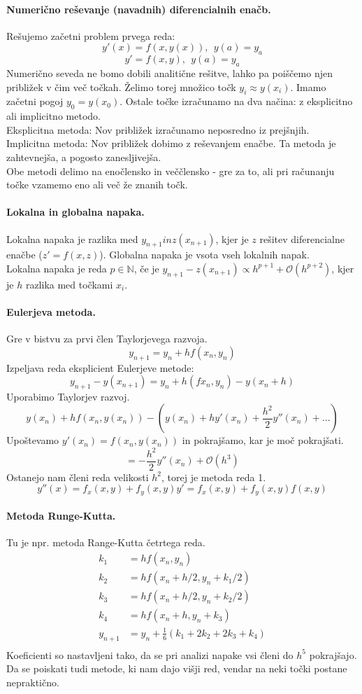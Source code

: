 \documentclass[a4paper]{article}
\newcommand{\N}{\mathbb{N}}
\begin{document}
\paragraph{Numerično reševanje (navadnih) diferencialnih enačb.} Rešujemo začetni problem prvega reda:
$$y'(x) = f(x, y(x)),~~y(a) = y_a$$
$$y' = f(x, y),~~y(a) = y_a$$
Numerično seveda ne bomo dobili analitične rešitve, lahko pa poiščemo njen približek v čim več točkah. 
Želimo torej množico točk $y_i \approx y(x_i)$. Imamo začetni pogoj $y_0 = y(x_0)$. Ostale točke izračunamo na dva načina:
z eksplicitno ali implicitno metodo. \\
Eksplicitna metoda: Nov približek izračunamo neposredno iz prejšnjih. \\
Implicitna metoda: Nov približek dobimo z reševanjem enačbe. Ta metoda je zahtevnejša, a pogosto zanesljivejša. \\
Obe metodi delimo na enočlensko in veččlensko - gre za to, ali pri računanju točke vzamemo eno ali več že znanih točk.
\paragraph{Lokalna in globalna napaka.} Lokalna napaka je razlika med $y_{n+1} in z(x_{n+1})$, kjer je $z$ rešitev diferencialne enačbe ($z' = f(x, z)$).
Globalna napaka je vsota vseh lokalnih napak. \\
Lokalna napaka je reda $p \in \N$, če je
$y_{n+1} - z(x_{n+1}) \propto h^{p+1} + \mathcal{O}(h^{p+2})$, kjer je $h$ razlika med točkami $x_i$.
\paragraph{Eulerjeva metoda.} Gre v bistvu za prvi člen Taylorjevega razvoja.
$$y_{n+1} = y_n + hf(x_n, y_n)$$
Izpeljava reda eksplicient Eulerjeve metode:
$$y_{n+1} - y(x_{n+1}) =y_n + h(fx_n, y_n) - y(x_n + h)$$
Uporabimo Taylorjev razvoj.
$$y(x_n) + hf(x_n, y(x_n)) - \left(y(x_n) + hy'(x_n) + \frac{h^2}{2}y''(x_n) + ...\right)$$
Upoštevamo $y'(x_n) = f(x_n, y(x_n))$ in pokrajšamo, kar je moč pokrajšati.
$$= -\frac{h^2}{2}y''(x_n) + \mathcal{O}(h^3)$$
Ostanejo nam členi reda velikosti $h^2$, torej je metoda reda 1.
$$y''(x) = f_x(x, y) + f_y(x, y) y' = f_x(x, y) + f_y(x, y) f(x, y)$$
\paragraph{Metoda Runge-Kutta.} Tu je npr. metoda Range-Kutta četrtega reda.
\begin{align*}
    k_1 & = hf(x_n, y_n) \\
    k_2 & = hf(x_n + h/2, y_n + k_1/2) \\
    k_3 & = hf(x_n + h/2, y_n + k_2/2) \\
    k_4 & = hf(x_n + h, y_n + k_3) \\
    y_{n+1} & = y_n + \frac{1}{6}(k_1 + 2k_2 + 2k_3 + k_4) \\
\end{align*}
Koeficienti so nastavljeni tako, da se pri analizi napake vsi členi do $h^5$ pokrajšajo.
Da se poiskati tudi metode, ki nam dajo višji red, vendar na neki točki postane nepraktično.
\end{document}
